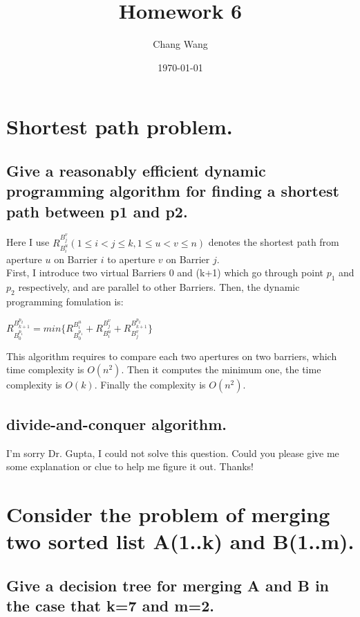 \documentclass[12pt, a4paper]{report}
\begin{document}
\title{Homework 6}
\author{Chang Wang}
\date{\today}

\maketitle

\section{Shortest path problem.}
\subsection{Give a reasonably efficient dynamic programming algorithm for finding a shortest path between p1 and p2.}
Here I use $R_{B_{i}^{u}}^{B_{j}^{v}} (1 \leq i < j \leq k , 1 \leq u < v \leq n)$ denotes the shortest path from aperture $u$ on Barrier $i$ to aperture $v$ on Barrier $j$. \\
First, I introduce two virtual Barriers 0 and (k+1) which go through point $p_{1}$ and $p_{2}$ respectively, and are parallel to other Barriers. Then, the dynamic programming fomulation is:
\begin{center}
$R_{B_{0}^{p_{1}}}^{B_{k+1}^{p_{2}}} = min \{R_{B_{0}^{p_{1}}}^{B_{i}^{u}} + R_{B_{i}^{u}}^{B_{j}^{v}} + R_{B_{j}^{v}}^{B_{k+1}^{p_{2}}}\}$
\end{center}
This algorithm requires to compare each two apertures on two barriers, which time complexity is $O(n^{2})$. Then it computes the minimum one, the time complexity is $O(k)$. Finally the complexity is $O(n^{2})$.

\subsection{divide-and-conquer algorithm.}
I'm sorry Dr. Gupta, I could not solve this question. Could you please give me some explanation or clue to help me figure it out. Thanks!

\section{Consider the problem of merging two sorted list A(1..k) and B(1..m).}
\subsection{Give a decision tree for merging A and B in the case that k=7 and m=2.}
\end{document}
